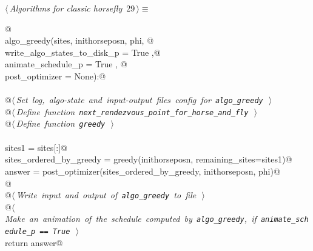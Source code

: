 \documentclass[11.5pt]{report}
\begin{document}
\begin{flushleft} \small\label{scrap36}\raggedright\small
{} $\langle\,${\itshape Algorithms for classic horsefly}\nobreak\ {\footnotesize {29}}$\,\rangle\equiv$
\vspace{-1ex}
\begin{list}{}{} \item
\mbox{}\verb@   @\\
\mbox{}\verb@def algo_greedy(sites, inithorseposn, phi, @\\
\mbox{}\verb@                write_algo_states_to_disk_p = True   ,@\\
\mbox{}\verb@                animate_schedule_p          = True   , @\\
\mbox{}\verb@                post_optimizer              = None):@\\
\mbox{}\verb@@\\
\mbox{}\verb@      @\hbox{$\langle\,${\itshape Set log, algo-state and input-output files config for \verb|algo_greedy|}\nobreak\ {\footnotesize {}}$\,\rangle$}\verb@@\\
\mbox{}\verb@      @\hbox{$\langle\,${\itshape Define function \verb|next_rendezvous_point_for_horse_and_fly|}\nobreak\ {\footnotesize {}}$\,\rangle$}\verb@@\\
\mbox{}\verb@      @\hbox{$\langle\,${\itshape Define function \verb|greedy|}\nobreak\ {\footnotesize {}}$\,\rangle$}\verb@@\\
\mbox{}\verb@@\\
\mbox{}\verb@      sites1                  = sites[:]@\\
\mbox{}\verb@      sites_ordered_by_greedy = greedy(inithorseposn, remaining_sites=sites1)@\\
\mbox{}\verb@      answer                  = post_optimizer(sites_ordered_by_greedy, inithorseposn, phi)@\\
\mbox{}\verb@    @\\
\mbox{}\verb@      @\hbox{$\langle\,${\itshape Write input and output of \verb|algo_greedy| to file}\nobreak\ {\footnotesize {}}$\,\rangle$}\verb@@\\
\mbox{}\verb@      @\hbox{$\langle\,${\itshape Make an animation of the schedule computed by \verb|algo_greedy|, if \verb|animate_schedule_p == True|}\nobreak\ {\footnotesize {}}$\,\rangle$}\verb@@\\
\mbox{}\verb@      return answer@\\

\end{list}
\end{flushleft}
\end{document}

